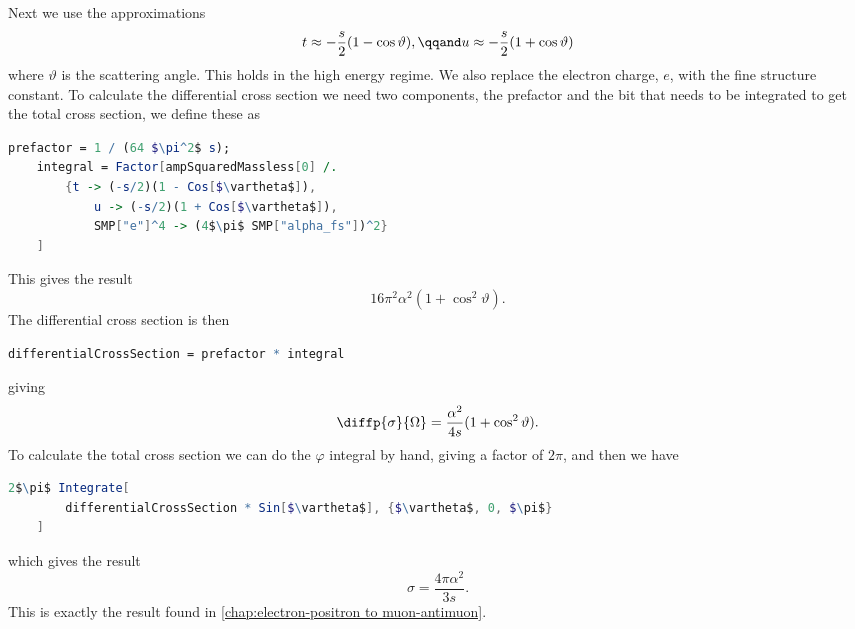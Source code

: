 Next we use the approximations
\begin{equation}
    t \approx -\frac{s}{2}(1 - \cos\vartheta), \qqand u \approx -\frac{s}{2} (1 + \cos\vartheta)
\end{equation}
where \(\vartheta\) is the scattering angle.
This holds in the high energy regime.
We also replace the electron charge, \(e\), with the fine structure constant.
To calculate the differential cross section we need two components, the prefactor and the bit that needs to be integrated to get the total cross section, we define these as
\begin{lstlisting}[language=mathematica, gobble=4, mathescape]
    prefactor = 1 / (64 $\pi^2$ s);
    integral = Factor[ampSquaredMassless[0] /.
        {t -> (-s/2)(1 - Cos[$\vartheta$]),
            u -> (-s/2)(1 + Cos[$\vartheta$]),
            SMP["e"]^4 -> (4$\pi$ SMP["alpha_fs"])^2}
    ]
\end{lstlisting}
This gives the result
\begin{equation}
    16 \pi^2 \alpha^2(1 + \cos^2\vartheta).
\end{equation}
The differential cross section is then
\begin{lstlisting}[language=mathematica, gobble=4, mathescape]
    differentialCrossSection = prefactor * integral
\end{lstlisting}
giving
\begin{equation}
    \diffp{\sigma}{\Omega} = \frac{\alpha^2}{4s}(1 + \cos^2\vartheta).
\end{equation}
To calculate the total cross section we can do the \(\varphi\) integral by hand, giving a factor of \(2\pi\), and then we have
\begin{lstlisting}[language=mathematica, gobble=4, mathescape]
    2$\pi$ Integrate[
        differentialCrossSection * Sin[$\vartheta$], {$\vartheta$, 0, $\pi$}
    ]
\end{lstlisting}
which gives the result
\begin{equation}
    \sigma = \frac{4\pi \alpha^2}{3s}.
\end{equation}
This is exactly the result found in \cref{chap:electron-positron to muon-antimuon}.